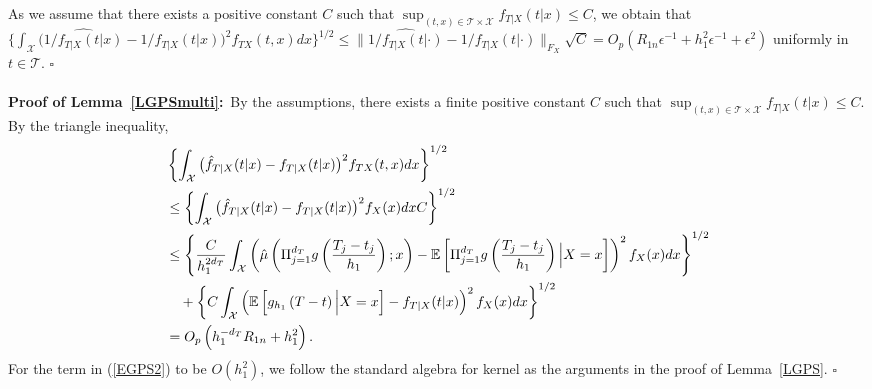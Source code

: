 \documentclass[lettersize, 12pt]{article}
\begin{document}
As we assume that there exists a positive constant $C$ such that $\sup_{(t, x) \in\mathcal{T}\times\mathcal{X}} f_{T|X}(t|x) \leq C$, 
we obtain that $\Big\{\int_\mathcal{X} \big( \widehat{1/f_{T|X}(t|x)}  - 1/f_{T|X}(t|x)
\big)^2 f_{TX}(t,x)dx \Big\}^{1/2} \leq
 \Big\| \widehat{1/f_{T|X}(t|\cdot)}  - 1/f_{T|X}(t|\cdot)\Big\|_{F_X} \sqrt{C}
= O_p(R_{1n}\epsilon^{-1} + h_1^2\epsilon^{-1} + \epsilon^2)$ uniformly in $t\in\mathcal{T}$.
\hfill $\square$
\\
\\
\textbf{Proof of Lemma~\ref{LGPSmulti}:}\ 
By the assumptions, there exists a finite positive constant $C$ such that $\sup_{(t, x) \in\mathcal{T}\times\mathcal{X}} f_{T|X}(t|x) \leq C$.
By the triangle inequality,
\begin{align}
&\left\{\int_\mathcal{X} \big( \hat f_{T|X}(t|x) - f_{T|X}(t|x) \big)^2 f_{TX}(t,x)dx \right\}^{1/2}\notag \\
&\leq \left\{ \int_\mathcal{X} \big( \hat f_{T|X}(t|x) - f_{T|X}(t|x) \big)^2 f_{X}(x)dx C\right\}^{1/2}
 \notag \\
&\leq \left\{ \frac{C}{h_1^{2d_T}}  \int_\mathcal{X}\left( \hat \mu\left( \Pi_{j=1}^{d_T}g\left(\frac{T_{j}-t_j}{h_1}\right);x \right) - \mathbb{E} \left[\Pi_{j=1}^{d_T}g\left(\frac{T_{j}-t_j}{h_1}\right)\Big| X=x \right] \right)^2 f_{X}(x)dx\right\}^{1/2}
\notag 
\\
&\ \ \ + \left\{ C\int_\mathcal{X}\left( \mathbb{E} \left[g_{h_1}\left(T-t\right)\Big| X=x \right]  - f_{T|X}(t|x) \right)^2 f_{X}(x)dx\right\}^{1/2}
\label{EGPS2}
 \\
&= O_p\left( h_1^{-d_T}R_{1n} + h_1^2\right). \notag
\end{align}
For the term in (\ref{EGPS2}) to be $O(h_1^2)$, we follow the standard algebra for kernel as the arguments in the proof of Lemma~\ref{LGPS}.
\hfill $\square$
\\
\\
\end{document}
